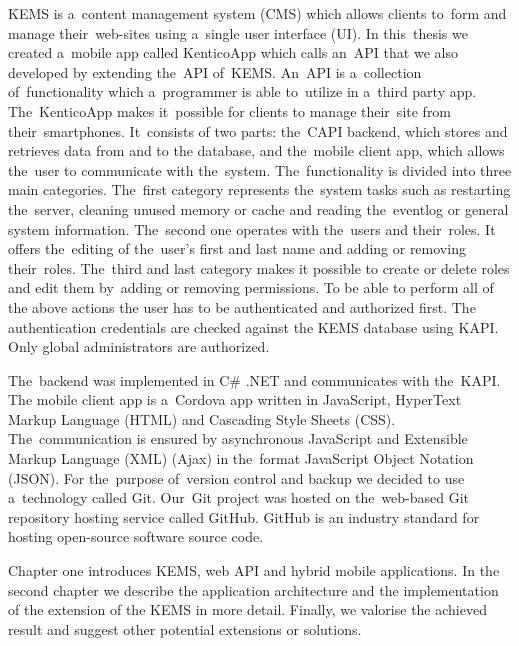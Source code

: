 \label{introduction}
KEMS is a~content management system (CMS) which allows clients to~form and manage their~web-sites using a~single user interface (UI). In this~thesis we created a~mobile app called KenticoApp which calls an~API that we also developed by extending the~API of~KEMS. An~API is a~collection of~functionality which a~programmer is able to~utilize in a~third party app. The~KenticoApp makes it~possible for clients to manage their~site from their~smartphones. It~consists of two parts: the~CAPI backend, which stores and retrieves data from and to the database, and the~mobile client app, which allows the~user to communicate with the~system.  The~functionality is divided into three main categories. The~first category represents the~system tasks such as restarting the~server, cleaning unused memory or cache and reading the~eventlog or general system information. The~second one operates with the~users and their~roles. It offers the~editing of the~user's first and last name and adding or removing their~roles. The~third and last category makes it possible to create or delete roles and edit them by~adding or removing permissions. To be able to perform all of the above actions the user has to be authenticated and authorized first. The authentication credentials are checked against the KEMS database using KAPI. Only global administrators are authorized.

The~backend was implemented in C\# .NET and communicates with the~KAPI. The mobile client app is a~Cordova app written in JavaScript, HyperText Markup Language (HTML) and Cascading Style Sheets (CSS). The~communication is ensured by asynchronous JavaScript and Extensible Markup Language (XML) (Ajax) in the~format JavaScript Object Notation (JSON). For the~purpose of~version control and backup we decided to use a~technology called Git. Our~Git project was hosted on the~web-based Git repository hosting service called GitHub. GitHub is an industry standard for hosting open-source software source code. 

Chapter one introduces KEMS, web API and hybrid mobile applications. In the second chapter we describe the application architecture and the implementation of the extension of the KEMS in more detail. Finally, we valorise the achieved result and suggest other potential extensions or solutions.

